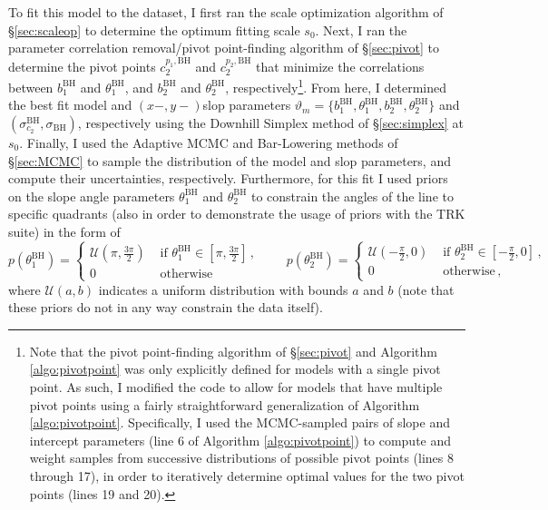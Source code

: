 To fit this model to the dataset, I first ran the scale optimization algorithm of \S\ref{sec:scaleop} to determine the optimum fitting scale $s_0$. Next, I ran the parameter correlation removal/pivot point-finding algorithm of \S\ref{sec:pivot} to determine the pivot points $c_2^{p_1,\text{BH}}$ and $c_2^{p_2,\text{BH}}$ that minimize the correlations between $b_1^{\text{BH}}$ and $\theta_1^{\text{BH}}$, and $b_2^{\text{BH}}$ and $\theta_2^{\text{BH}}$, respectively\footnote{Note that the pivot point-finding algorithm of \S\ref{sec:pivot} and Algorithm \ref{algo:pivotpoint} was only explicitly defined for models with a single pivot point. As such, I modified the code to allow for models that have multiple pivot points using a fairly straightforward generalization of Algorithm \ref{algo:pivotpoint}. Specifically, I used the MCMC-sampled pairs of slope and intercept parameters (line 6 of Algorithm \ref{algo:pivotpoint}) to compute and weight samples from successive distributions of possible pivot points (lines 8 through 17), in order to iteratively determine optimal values for the two pivot points (lines 19 and 20).}. From here, I determined the best fit model and $(x-,y-)$slop parameters $\vartheta_m=\{b_1^{\text{BH}}, \theta_1^{\text{BH}}, b_2^{\text{BH}}, \theta_2^{\text{BH}}\}$ and $(\sigma_{c_2}^{\text{BH}}, \sigma_{\text{BH}})$, respectively using the Downhill Simplex method of \S\ref{sec:simplex} at $s_0$. Finally, I used the Adaptive MCMC and Bar-Lowering methods of \S\ref{sec:MCMC} to sample the distribution of the model and slop parameters, and compute their uncertainties, respectively. Furthermore, for this fit I used priors on the slope angle parameters $\theta_1^{\text{BH}}$ and $\theta_2^{\text{BH}}$ to constrain the angles of the line to specific quadrants (also in order to demonstrate the usage of priors with the TRK suite) in the form of
\begin{equation}\label{eq:bhc2priors}
p(\theta_1^{\text{BH}}) =  \left\{ \begin{array} {lr}
        \mathcal{U}(\pi, \frac{3\pi}{2}) & \,\,\mbox{if $\theta_1^{\text{BH}} \in [\pi, \frac{3\pi}{2}]$}\, ,\\
        0 & \,\,\mbox{otherwise} \,
        \end{array}\right.
        \qquad
p(\theta_2^{\text{BH}}) =  \left\{ \begin{array} {lr}
        \mathcal{U}(-\frac{\pi}{2}, 0) & \,\,\mbox{if $\theta_2^{\text{BH}} \in [-\frac{\pi}{2}, 0]$}\, ,\\
        0 & \,\,\mbox{otherwise} \,,
        \end{array}\right.
\end{equation}
where $\mathcal{U}(a,b)$ indicates a uniform distribution with bounds $a$ and $b$ (note that these priors do not in any way constrain the data itself).

